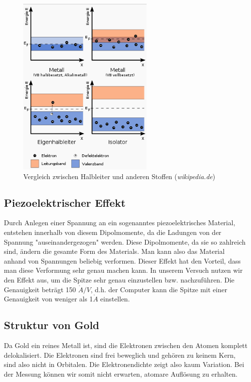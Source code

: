 \begin{figure}[H]
	\centering \includegraphics[width=0.6\textwidth]{Bilder/Halbleiter.png}
	\caption{Vergleich zwischen Halbleiter und anderen Stoffen (\emph{wikipedia.de})}
\end{figure}

\subsection{Piezoelektrischer Effekt}

Durch Anlegen einer Spannung an ein sogenanntes piezoelektrisches Material, entstehen innerhalb von diesem Dipolmomente, da die Ladungen von der Spannung "auseinandergezogen" werden. Diese Dipolmomente, da sie so zahlreich sind, ändern die gesamte Form des Materials. Man kann also das Material anhand von Spannungen beliebig verformen. Dieser Effekt hat den Vorteil, dass man diese Verformung sehr genau machen kann. In unserem Versuch nutzen wir den Effekt aus, um die Spitze sehr genau einzustellen bzw. nachzuführen. Die Genauigkeit beträgt 150 $\mathring A/V$, d.h. der Computer kann die Spitze mit einer Genauigkeit von weniger als 1$\mathring A$ einstellen.

\subsection{Struktur von Gold}

Da Gold ein reines Metall ist, sind die Elektronen zwischen den Atomen komplett delokalisiert. Die Elektronen sind frei beweglich und gehören zu keinem Kern, sind also nicht in Orbitalen. Die Elektronendichte zeigt also kaum Variation. Bei der Messung können wir somit nicht erwarten, atomare Auflösung zu erhalten.

